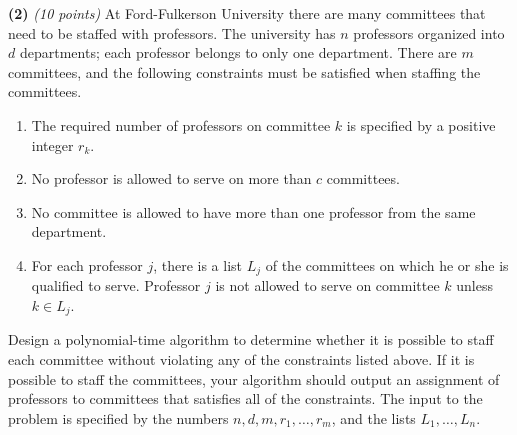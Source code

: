 \documentclass[11pt]{article}
\def\bigap{0.25in}
\begin{document}
\setlength{\parindent}{0in}
\addtolength{\parskip}{0.1cm}
\setlength{\fboxrule}{.5mm}\setlength{\fboxsep}{1.2mm}
\newlength{\boxlength}\setlength{\boxlength}{\textwidth}
\addtolength{\boxlength}{-4mm}
\begin{center}
\end{center}
\vspace{5mm}

{ \bf (2)} {\em (10 points)}
At Ford-Fulkerson University  there are many 
committees that need to be staffed with professors.  The 
university has $n$ professors organized into $d$ departments;
each professor belongs to only one department.  There are 
$m$ committees, and the following constraints
must be satisfied when staffing the committees.
\begin{enumerate}
\item
The required number of professors on committee $k$ is 
specified by a positive integer $r_k$.
\item
No professor is allowed to serve on more than $c$ committees.
\item
No committee is allowed to have more than one professor
from the same department.
\item
For each professor $j$, there is a list $L_j$ of the 
committees on which he or she is qualified to serve.  
Professor $j$ is not allowed to serve on committee $k$
unless $k \in L_j$.
\end{enumerate}
Design a polynomial-time algorithm to determine whether 
it is possible to staff each committee
without violating any of the constraints listed above.
If it is possible to staff the committees, your algorithm should output an
assignment of professors to committees that satisfies
all of the constraints.  The input to the problem
is specified by the numbers $n,d,m, r_1,\ldots,r_m$,
and the lists $L_1,\ldots,L_n$.


\vskip \bigap

\end{document}
